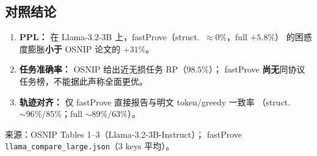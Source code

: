 \documentclass[11pt,a4paper]{article}
\begin{document}
\vspace{1.2em}
\subsection*{对照结论}
\begin{enumerate}
  \item \textbf{PPL：} 在 Llama-3.2-3B 上，fastProve（struct.\ $\approx0\%$，full $+5.8\%$）
    的困惑度膨胀\textbf{小于} OSNIP 论文的 $+31\%$。
  \item \textbf{任务准确率：} OSNIP 给出近无损任务 RP（$98.5\%$）；
    fastProve \textbf{尚无}同协议任务榜，不能据此声称全面更优。
  \item \textbf{轨迹对齐：} 仅 fastProve 直接报告与明文 token/greedy 一致率
    （struct.\ $\sim96\%/85\%$；full $\sim89\%/63\%$）。
\end{enumerate}

\vspace{0.5em}
{\scriptsize\color{note}
来源：OSNIP Tables 1--3（Llama-3.2-3B-Instruct）；
fastProve \texttt{llama\_compare\_large.json}（3 keys 平均）。
}
\end{document}
